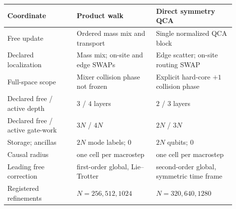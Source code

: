 \begin{tabular}{@{}p{0.28\linewidth}p{0.32\linewidth}p{0.32\linewidth}@{}}
\toprule
Coordinate & Product walk & Direct symmetry QCA \\
\midrule
Free update & Ordered mass mix and transport & Single normalized QCA block \\
Declared localization & Mass mix; on-site and edge SWAPs & Edge scatter; on-site routing SWAP \\
Full-space scope & Mixer collision phase not frozen & Explicit hard-core $+1$ collision phase \\
Declared free / active depth & $3$ / $4$ layers & $2$ / $3$ layers \\
Declared free / active gate-work & $3N$ / $4N$ & $2N$ / $3N$ \\
Storage; ancillas & $2N$ mode labels; $0$ & $2N$ qubits; $0$ \\
Causal radius & one cell per macrostep & one cell per macrostep \\
Leading free correction & first-order global, Lie--Trotter & second-order global, symmetric time frame \\
Registered refinements & $N=256,512,1024$ & $N=320,640,1280$ \\
\bottomrule
\end{tabular}
